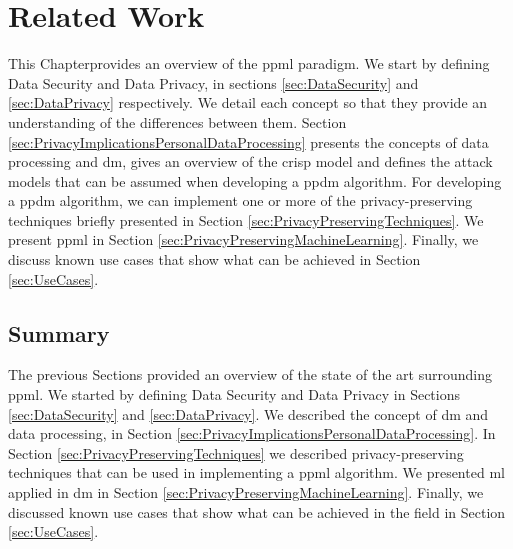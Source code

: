 %

\acresetall

\chapter{Related Work}
\label{ch:RelatedWork}


This Chapterprovides an overview of the \ac{ppml} paradigm.
We start by defining Data Security and Data Privacy, in sections \ref{sec:DataSecurity} and \ref{sec:DataPrivacy} respectively. We detail each concept so that they provide an understanding of the differences between them.
Section \ref{sec:PrivacyImplicationsPersonalDataProcessing} presents the concepts of data processing and \ac{dm}, gives an overview of the \ac{crisp} model and defines the attack models that can be assumed when developing a \ac{ppdm} algorithm.
For developing a \ac{ppdm} algorithm, we can implement one or more of the privacy-preserving techniques briefly presented in Section \ref{sec:PrivacyPreservingTechniques}. 
We present \ac{ppml} in Section \ref{sec:PrivacyPreservingMachineLearning}. Finally, we discuss known use cases that show what can be achieved in Section \ref{sec:UseCases}.









\section{Summary}
\label{sec:SummaryRelatedWork}

The previous Sections provided an overview of the state of the art surrounding \ac{ppml}.
We started by defining Data Security and Data Privacy in Sections \ref{sec:DataSecurity} and \ref{sec:DataPrivacy}.
We described the concept of \ac{dm} and data processing, in Section \ref{sec:PrivacyImplicationsPersonalDataProcessing}.
In Section \ref{sec:PrivacyPreservingTechniques} we described privacy-preserving techniques that can be used in implementing a \ac{ppml} algorithm.
We presented \ac{ml} applied in \ac{dm} in Section \ref{sec:PrivacyPreservingMachineLearning}. Finally, we discussed known use cases that show what can be achieved in the field in Section \ref{sec:UseCases}.


